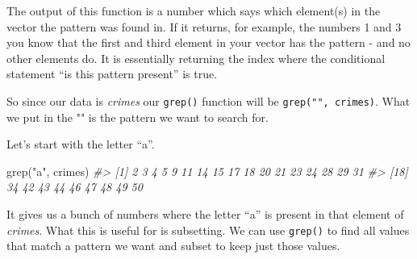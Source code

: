 \documentclass[
  12pt,
  openany]{book}
\newenvironment{Shaded}{\begin{snugshade}}{\end{snugshade}}
\newcommand{\CommentTok}[1]{\textcolor[rgb]{0.37,0.37,0.37}{\textit{#1}}}
\newcommand{\FunctionTok}[1]{\textcolor[rgb]{0,0,0}{#1}}
\newcommand{\NormalTok}[1]{#1}
\newcommand{\StringTok}[1]{\textcolor[rgb]{0.5,0.5,0.5}{#1}}
\begin{document}
The output of this function is a number which says which element(s) in the vector the pattern was found in. If it returns, for example, the numbers 1 and 3 you know that the first and third element in your vector has the pattern - and no other elements do. It is essentially returning the index where the conditional statement ``is this pattern present'' is true.

So since our data is \emph{crimes} our \texttt{grep()} function will be \texttt{grep("",\ crimes)}. What we put in the "" is the pattern we want to search for.

Let's start with the letter ``a''.

\begin{Shaded}
\begin{Highlighting}[]
\FunctionTok{grep}\NormalTok{(}\StringTok{"a"}\NormalTok{, crimes)}
\CommentTok{\#\textgreater{}  [1]  2  3  4  5  9 11 14 15 17 18 20 21 23 24 28 29 31}
\CommentTok{\#\textgreater{} [18] 34 42 43 44 46 47 48 49 50}
\end{Highlighting}
\end{Shaded}

It gives us a bunch of numbers where the letter ``a'' is present in that element of \emph{crimes}. What this is useful for is subsetting. We can use \texttt{grep()} to find all values that match a pattern we want and subset to keep just those values.
\end{document}
